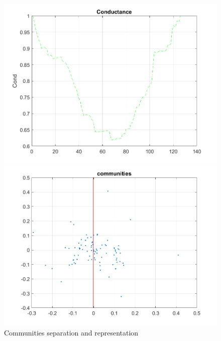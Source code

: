 \documentclass[12pt,a4paper]{article}
\begin{document}
\begin{figure}
\centering
\begin{minipage}[c]{0.47\textwidth}
  \includegraphics[width = \textwidth]{img/Conductance}
\end{minipage}
\begin{minipage}[c]{0.47\textwidth}
  \includegraphics[width = \textwidth]{img/Communities}
\end{minipage}
\caption{Communities separation and representation}
\label{fig:comm}
\end{figure}
\end{document}
